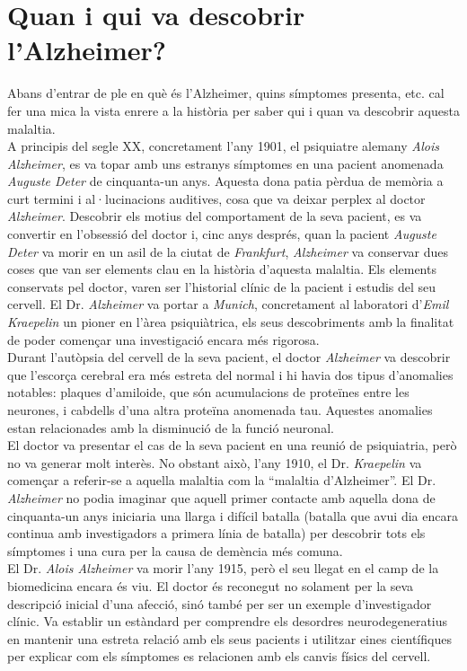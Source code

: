 \documentclass[a4paper,12pt]{report}
\begin{document}
\section*{Quan i qui va descobrir l'Alzheimer?}
Abans d'entrar de ple en què és l'Alzheimer, quins símptomes presenta, etc. cal fer una mica la vista enrere a la història per saber qui i quan va descobrir aquesta malaltia.\\
A principis del segle XX, concretament l'any 1901, el psiquiatre alemany \textit{Alois Alzheimer}, es va topar amb uns estranys símptomes en una pacient anomenada \textit{Auguste Deter} de cinquanta-un anys. Aquesta dona patia pèrdua de memòria a curt termini i al·lucinacions auditives, cosa que va deixar perplex al doctor \textit{Alzheimer}. Descobrir els motius del comportament de la seva pacient, es va convertir en l'obsessió del doctor i, cinc anys després, quan la pacient \textit{Auguste Deter} va morir en un asil de la ciutat de \textit{Frankfurt}, \textit{Alzheimer} va conservar dues coses que van ser elements clau en la història d'aquesta malaltia. Els elements conservats pel doctor, varen ser l'historial clínic de la pacient i estudis del seu cervell. El Dr. \textit{Alzheimer} va portar a \textit{Munich}, concretament al laboratori d'\textit{Emil Kraepelin} un pioner en l'àrea psiquiàtrica, els seus descobriments amb la finalitat de poder començar una investigació encara més rigorosa.\\
Durant l'autòpsia del cervell de la seva pacient, el doctor \textit{Alzheimer} va descobrir que l'escorça cerebral era més estreta del normal i hi havia dos tipus d'anomalies notables: plaques d'amiloide, que són acumulacions de proteïnes entre les neurones, i cabdells d'una altra proteïna anomenada tau. Aquestes anomalies estan relacionades amb la disminució de la funció neuronal.\\
El doctor va presentar el cas de la seva pacient en una reunió de psiquiatria, però no va generar molt interès. No obstant això, l'any 1910, el Dr. \textit{Kraepelin} va començar a referir-se a aquella malaltia com la “malaltia d'Alzheimer”. El Dr. \textit{Alzheimer} no podia imaginar que aquell primer contacte amb aquella dona de cinquanta-un anys iniciaria una llarga i difícil batalla (batalla que avui dia encara continua amb investigadors a primera línia de batalla) per descobrir tots els símptomes i una cura per la causa de demència més comuna.\\
El Dr. \textit{Alois Alzheimer} va morir l'any 1915, però el seu llegat en el camp de la biomedicina encara és viu. El doctor és reconegut no solament per la seva descripció inicial d'una afecció, sinó també per ser un exemple d'investigador clínic. Va establir un estàndard per comprendre els desordres neurodegeneratius en mantenir una estreta relació amb els seus pacients i utilitzar eines científiques per explicar com els símptomes es relacionen amb els canvis físics del cervell.
\end{document}
